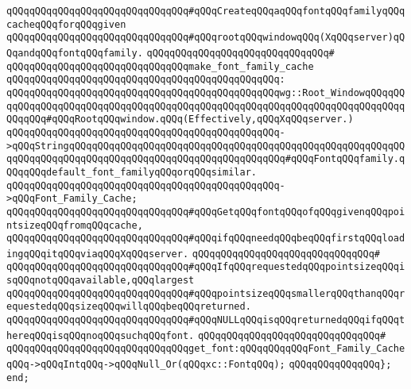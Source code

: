 \newline
\verb|qQQqqQQqqQQqqQQqqQQqqQQqqQQqqQQq#qQQqCreateqQQqaqQQqfontqQQqfamilyqQQqcacheqQQqforqQQqgiven|\newline
\verb|qQQqqQQqqQQqqQQqqQQqqQQqqQQqqQQq#qQQqrootqQQqwindowqQQq(XqQQqserver)qQQqandqQQqfontqQQqfamily.|\newline
\verb|qQQqqQQqqQQqqQQqqQQqqQQqqQQqqQQq#|\newline
\verb|qQQqqQQqqQQqqQQqqQQqqQQqqQQqqQQqmake_font_family_cache|\newline
\verb|qQQqqQQqqQQqqQQqqQQqqQQqqQQqqQQqqQQqqQQqqQQqqQQq:|\newline
\verb|qQQqqQQqqQQqqQQqqQQqqQQqqQQqqQQqqQQqqQQqqQQqqQQqwg::Root_WindowqQQqqQQqqQQqqQQqqQQqqQQqqQQqqQQqqQQqqQQqqQQqqQQqqQQqqQQqqQQqqQQqqQQqqQQqqQQqqQQqqQQq#qQQqRootqQQqwindow.qQQq(Effectively,qQQqXqQQqserver.)|\newline
\verb|qQQqqQQqqQQqqQQqqQQqqQQqqQQqqQQqqQQqqQQqqQQqqQQq->qQQqStringqQQqqQQqqQQqqQQqqQQqqQQqqQQqqQQqqQQqqQQqqQQqqQQqqQQqqQQqqQQqqQQqqQQqqQQqqQQqqQQqqQQqqQQqqQQqqQQqqQQqqQQqqQQq#qQQqFontqQQqfamily.qQQqqQQqdefault_font_familyqQQqorqQQqsimilar.|\newline
\verb|qQQqqQQqqQQqqQQqqQQqqQQqqQQqqQQqqQQqqQQqqQQqqQQq->qQQqFont_Family_Cache;|\newline
\newline
\verb|qQQqqQQqqQQqqQQqqQQqqQQqqQQqqQQq#qQQqGetqQQqfontqQQqofqQQqgivenqQQqpointsizeqQQqfromqQQqcache,|\newline
\verb|qQQqqQQqqQQqqQQqqQQqqQQqqQQqqQQq#qQQqifqQQqneedqQQqbeqQQqfirstqQQqloadingqQQqitqQQqviaqQQqXqQQqserver.|\newline
\verb|qQQqqQQqqQQqqQQqqQQqqQQqqQQqqQQq#|\newline
\verb|qQQqqQQqqQQqqQQqqQQqqQQqqQQqqQQq#qQQqIfqQQqrequestedqQQqpointsizeqQQqisqQQqnotqQQqavailable,qQQqlargest|\newline
\verb|qQQqqQQqqQQqqQQqqQQqqQQqqQQqqQQq#qQQqpointsizeqQQqsmallerqQQqthanqQQqrequestedqQQqsizeqQQqwillqQQqbeqQQqreturned.|\newline
\verb|qQQqqQQqqQQqqQQqqQQqqQQqqQQqqQQq#qQQqNULLqQQqisqQQqreturnedqQQqifqQQqthereqQQqisqQQqnoqQQqsuchqQQqfont.|\newline
\verb|qQQqqQQqqQQqqQQqqQQqqQQqqQQqqQQq#|\newline
\verb|qQQqqQQqqQQqqQQqqQQqqQQqqQQqqQQqget_font:qQQqqQQqqQQqFont_Family_CacheqQQq->qQQqIntqQQq->qQQqNull_Or(qQQqxc::FontqQQq);|\newline
\verb|qQQqqQQqqQQqqQQq};|\newline
\newline
\verb|end;|\newline
\newline

